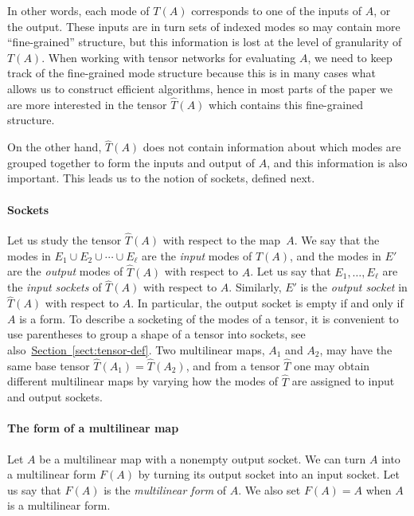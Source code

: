 \documentclass[11pt]{article}
\numberwithin{equation}{section}
\theoremstyle{definition}
\theoremstyle{plain}
\newcommand{\expref}[2]{\hyperref[#2]{#1~\ref{#2}}}
\begin{document}
In other words, each mode of $T(A)$ corresponds to one of the inputs
of $A$, or the output.  These inputs are in turn sets of indexed modes
so may contain more ``fine-grained'' structure, but this information
is lost at the level of granularity of $T(A)$.  When working with
tensor networks for evaluating $A$, we need to keep track of the
fine-grained mode structure because this is in many cases what allows
us to construct efficient algorithms, hence in most parts of the paper
we are more interested in the tensor $\hat{T}(A)$ which contains this
fine-grained structure.

On the other hand, $\hat{T}(A)$ does not contain information about
which modes are grouped together to form the inputs and output of $A$,
and this information is also important.  This leads us to the notion
of sockets, defined next.

\paragraph*{Sockets}

Let us study the tensor $\hat{T}(A)$ with respect to the map~$A$.
We say that the modes in
$E_1\cup E_2\cup\cdots\cup E_\ell$ %
are the \emph{input} modes of $\hat{T}(A)$,
and the modes in $E'$ are the \emph{output} modes of $\hat{T}(A)$ with respect to $A$.
Let us say that $E_1, \ldots, E_\ell$ are the
\emph{input sockets} of $\hat{T}(A)$ with respect to $A$. Similarly,
$E'$ is the \emph{output socket} in $\hat{T}(A)$ with respect to $A$.
In particular, the output socket is empty if and only if $A$ is a form. To describe a socketing of the modes of a tensor, it is convenient to
use parentheses to group a 
%
%
%
shape of a tensor
into sockets, see also~\expref{Section}{sect:tensor-def}.
%
Two multilinear maps, $A_1$ and $A_2$, %
may have the same base tensor $\hat{T}(A_1)=\hat{T}(A_2)$, and from a tensor $\hat{T}$ one may
obtain different multilinear maps by varying how the modes of $\hat{T}$
are assigned to input and output sockets.

\paragraph*{The form of a multilinear map}

Let $A$ be a multilinear map with a nonempty output socket.
We can turn $A$ into a multilinear form $F(A)$ by turning
its output socket into an input socket.
Let us say that $F(A)$ is the \emph{multilinear form} of $A$.
We also set $F(A)=A$ when $A$ is a multilinear form.
\end{document}
